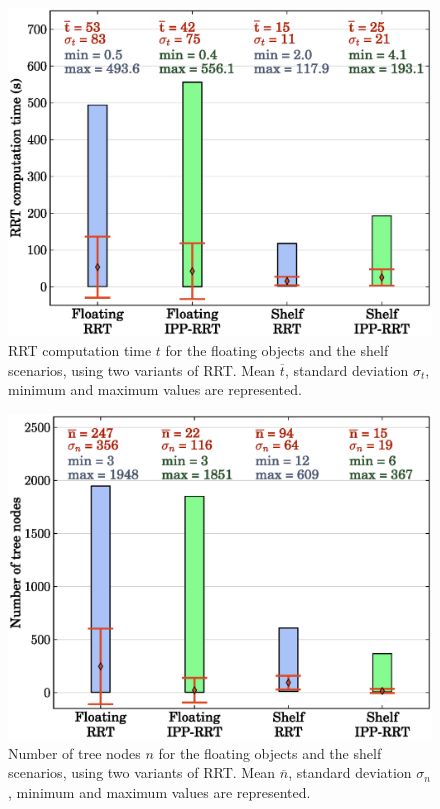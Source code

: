 \documentclass{article}
\begin{document}
\begin{figure}[H]
\centering
\includegraphics[width=0.8\linewidth]{plots/rrt-t.eps}
\caption{RRT computation time $t$ for the floating objects and the shelf
  scenarios, using two variants of RRT. Mean $\overline{t}$, standard
  deviation $\sigma_{t}$, minimum and maximum values are represented.}
\label{fig:rrt-t}
\end{figure}

\begin{figure}[H]
\centering
\includegraphics[width=0.8\linewidth]{plots/rrt-n.eps}
\caption{Number of tree nodes $n$ for the floating objects and the
  shelf scenarios, using two variants of RRT. Mean $\overline{n}$,
  standard deviation $\sigma_{n}$, minimum and maximum values are
  represented.}
\label{fig:rrt-n}
\end{figure}

   



\end{document}
